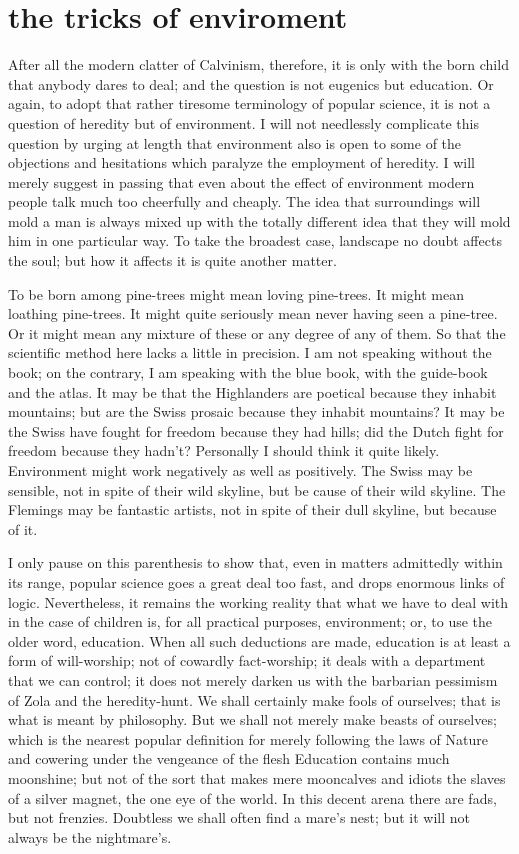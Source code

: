 \documentclass[final,10pt,letterpaper,twocolumn,openany]{book}
\begin{document}
\section{the tricks of enviroment}

    After all the modern clatter of Calvinism, therefore, it is only with the
born child that anybody dares to deal; and the question is not eugenics but
education. Or again, to adopt that rather tiresome terminology of popular
science, it is not a question of heredity but of environment. I will not
needlessly complicate this question by urging at length that environment
also is open to some of the objections and hesitations which paralyze the
employment of heredity. I will merely suggest in passing that even about
the effect of environment modern people talk much too cheerfully and
cheaply. The idea that surroundings will mold a man is always mixed up
with the totally different idea that they will mold him in one particular
way. To take the broadest case, landscape no doubt affects the soul; but
how it affects it is quite another matter. 

To be born among pine-trees might
mean loving pine-trees. It might mean loathing pine-trees. It might quite
seriously mean never having seen a pine-tree. Or it might mean any
mixture of these or any degree of any of them. So that the scientific
method here lacks a little in precision. I am not speaking without the book;
on the contrary, I am speaking with the blue book, with the guide-book
and the atlas. It may be that the Highlanders are poetical because they
inhabit mountains; but are the Swiss prosaic because they inhabit
mountains? It may be the Swiss have fought for freedom because they had
hills; did the Dutch fight for freedom because they hadn't? Personally I
should think it quite likely. Environment might work negatively as well as
positively. The Swiss may be sensible, not in spite of their wild skyline,
but be cause of their wild skyline. The Flemings may be fantastic artists,
not in spite of their dull skyline, but because of it.

I only pause on this parenthesis to show that, even in matters
admittedly within its range, popular science goes a great deal too fast, and
drops enormous links of logic. Nevertheless, it remains the working reality
that what we have to deal with in the case of children is, for all practical
purposes, environment; or, to use the older word, education. When all such
deductions are made, education is at least a form of will-worship; not of
cowardly fact-worship; it deals with a department that we can control; it
does not merely darken us with the barbarian pessimism of Zola and the
heredity-hunt. We shall certainly make fools of ourselves; that is what is
meant by philosophy. But we shall not merely make beasts of ourselves;
which is the nearest popular definition for merely following the laws of
Nature and cowering under the vengeance of the flesh Education contains
much moonshine; but not of the sort that makes mere mooncalves and
idiots the slaves of a silver magnet, the one eye of the world. In this decent
arena there are fads, but not frenzies. Doubtless we shall often find a
mare's nest; but it will not always be the nightmare's.
\end{document}
